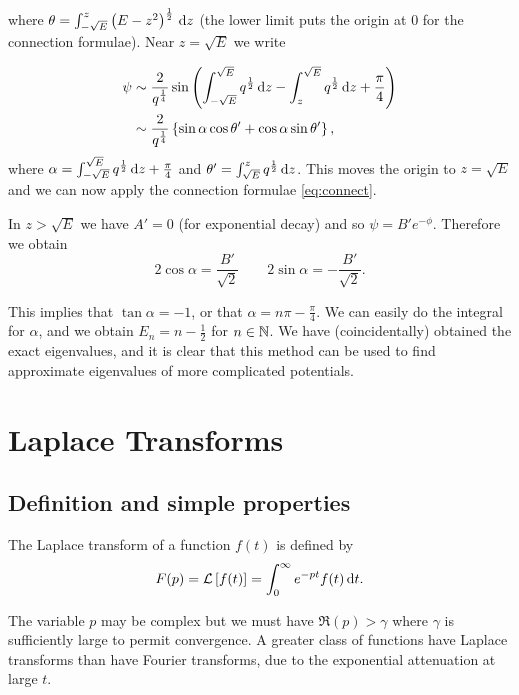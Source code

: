 \documentclass{notes}
\newcommand{\cL}[1]{\mathcal{L}\left[#1\right]}
\theoremstyle{plain}
\begin{document}
where $\theta = \int_{-\sqrt{E}}^z \left( E - z^2 \right)^{\frac{1}{2}}
\, \mathrm{d} z$ (the lower limit puts the origin at $0$ for the connection
formulae).  Near $z = \sqrt{E} $ we write

\begin{align*}
\psi &\sim \frac{2}{q^{\frac{1}{4}}} \sin \left(
\int_{-\sqrt{E}}^{\sqrt{E}} q^{\frac{1}{2}}\, \mathrm{d} z
- \int_z^{\sqrt{E}} q^{\frac{1}{2}}\, \mathrm{d} z + \frac{\pi}{4}
\right) \\
& \sim \frac{2}{q^{\frac{1}{4}}} \left\{
\sin \alpha \cos \theta' + \cos \alpha  \sin \theta'
\right\},
\end{align*}
where $\alpha = \int_{-\sqrt{E}}^{\sqrt{E}} q^{\frac{1}{2}}\, \mathrm{d} z +
\frac{\pi}{4}$ and $\theta' = \int_{\sqrt{E}}^z q^{\frac{1}{2}}\, \mathrm{d} z$.
This moves the origin to $z = \sqrt{E}$ and we can now apply the
connection formulae \eqref{eq:connect}.

In $z > \sqrt{E}$ we have $A' = 0$ (for exponential decay) and so
$\psi = B' e^{-\phi}$.  Therefore we obtain
\[
2 \cos \alpha = \frac{B'}{\sqrt{2}} \qquad 2 \sin \alpha = -
\frac{B'}{\sqrt{2}}.
\]

This implies that $\tan \alpha = -1$, or that $\alpha = n \pi -
\frac{\pi}{4}$.  We can easily do the integral for $\alpha$, and we
obtain $E_n = n - \frac{1}{2}$ for $n \in \mathbb{N}$.  We have
(coincidentally) obtained the exact eigenvalues, and it is clear that
this method can be used to find approximate eigenvalues of
more complicated potentials.

\chapter{Laplace Transforms}

\section{Definition and simple properties}

The Laplace transform of a function $f(t)$ is defined by
\begin{equation}\label{eq:lapt}
F(p) = \cL{f(t)} = \int_0^\infty e^{-p t} f(t)\, \ud t.
\end{equation}

The variable $p$ may be complex but we must have $\Re(p) > \gamma$ where
$\gamma$ is sufficiently large to permit convergence.  A greater class
of functions have Laplace transforms than have Fourier transforms, due to
the exponential attenuation at large $t$.
\end{document}
